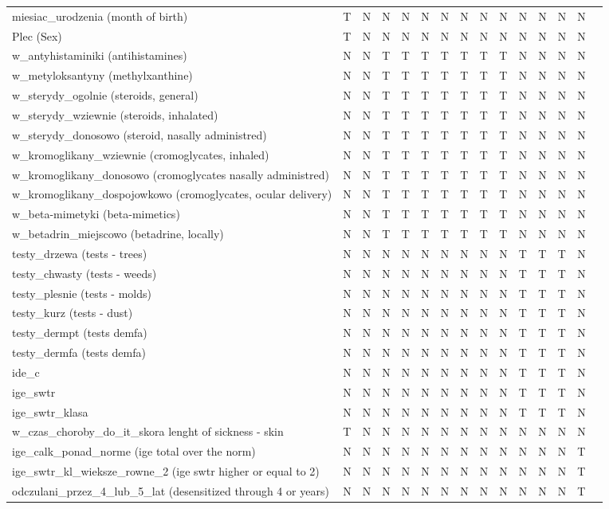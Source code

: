 \documentclass[10pt,oneside]{memoir}
\begin{document}
\begin{table}[htbp]
\begin{minipage}{\linewidth}
\begin{tabulary}{\linewidth}{@{}l@{}l@{}l@{}l@{}l@{}l@{}l@{}l@{}l@{}l@{}l@{}l@{}l@{}l@{}l@{}}
miesiac\_urodzenia (month of birth)&T&N&N&N&N&N&N&N&N&N&N&N&N \\
Plec (Sex)&T&N&N&N&N&N&N&N&N&N&N&N&N \\
w\_antyhistaminiki (antihistamines)&N&N&T&T&T&T&T&T&T&N&N&N&N \\
w\_metyloksantyny (methylxanthine)&N&N&T&T&T&T&T&T&T&N&N&N&N \\
w\_sterydy\_ogolnie (steroids, general)&N&N&T&T&T&T&T&T&T&N&N&N&N \\
w\_sterydy\_wziewnie (steroids, inhalated)&N&N&T&T&T&T&T&T&T&N&N&N&N \\
w\_sterydy\_donosowo (steroid, nasally administred)&N&N&T&T&T&T&T&T&T&N&N&N&N \\
w\_kromoglikany\_wziewnie (cromoglycates, inhaled)&N&N&T&T&T&T&T&T&T&N&N&N&N \\
w\_kromoglikany\_donosowo (cromoglycates nasally administred)&N&N&T&T&T&T&T&T&T&N&N&N&N \\
w\_kromoglikany\_dospojowkowo (cromoglycates, ocular delivery)&N&N&T&T&T&T&T&T&T&N&N&N&N \\
w\_beta-mimetyki (beta-mimetics)&N&N&T&T&T&T&T&T&T&N&N&N&N \\
w\_betadrin\_miejscowo (betadrine, locally)&N&N&T&T&T&T&T&T&T&N&N&N&N \\
testy\_drzewa (tests - trees)&N&N&N&N&N&N&N&N&N&T&T&T&N \\
testy\_chwasty (tests - weeds)&N&N&N&N&N&N&N&N&N&T&T&T&N \\
testy\_plesnie (tests - molds)&N&N&N&N&N&N&N&N&N&T&T&T&N \\
testy\_kurz (tests - dust)&N&N&N&N&N&N&N&N&N&T&T&T&N \\
testy\_dermpt (tests demfa)&N&N&N&N&N&N&N&N&N&T&T&T&N \\
testy\_dermfa (tests demfa)&N&N&N&N&N&N&N&N&N&T&T&T&N \\
ide\_c&N&N&N&N&N&N&N&N&N&T&T&T&N \\
ige\_swtr&N&N&N&N&N&N&N&N&N&T&T&T&N \\
ige\_swtr\_klasa&N&N&N&N&N&N&N&N&N&T&T&T&N \\
w\_czas\_choroby\_do\_it\_skora lenght of sickness - skin&T&N&N&N&N&N&N&N&N&N&N&N&N \\
ige\_calk\_ponad\_norme (ige total over the norm)&N&N&N&N&N&N&N&N&N&N&N&N&T \\
ige\_swtr\_kl\_wieksze\_rowne\_2 (ige swtr higher or equal to 2)&N&N&N&N&N&N&N&N&N&N&N&N&T \\
odczulani\_przez\_4\_lub\_5\_lat (desensitized through 4 or  years)&N&N&N&N&N&N&N&N&N&N&N&N&T \\

\end{tabulary}
\end{minipage}
\end{table}
\end{document}
